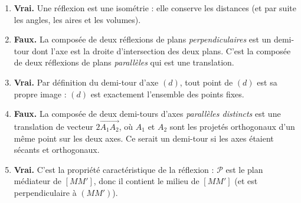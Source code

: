\documentclass[11pt]{article}
\newcommand{\cle}[1]{{\popxbold\color{popdark}#1}}
\begin{document}
\begin{corrige}
\begin{enumerate}
\item \textbf{Vrai.} Une réflexion est une isométrie : elle conserve les distances (et par suite les angles, les aires et les volumes).
\item \textbf{Faux.} La composée de deux réflexions de plans \emph{perpendiculaires} est un \cle{demi-tour} dont l'axe est la droite d'intersection des deux plans. C'est la composée de deux réflexions de plans \emph{parallèles} qui est une translation.
\item \textbf{Vrai.} Par définition du demi-tour d'axe $(d)$, tout point de $(d)$ est sa propre image : $(d)$ est exactement l'ensemble des points fixes.
\item \textbf{Faux.} La composée de deux demi-tours d'axes \emph{parallèles distincts} est une \cle{translation} de vecteur $2\overrightarrow{A_1A_2}$, où $A_1$ et $A_2$ sont les projetés orthogonaux d'un même point sur les deux axes. Ce serait un demi-tour si les axes étaient sécants et orthogonaux.
\item \textbf{Vrai.} C'est la propriété caractéristique de la réflexion : $\mathcal{P}$ est le plan médiateur de $[MM']$, donc il contient le milieu de $[MM']$ (et est perpendiculaire à $(MM')$).
\end{enumerate}
\end{corrige}
\end{document}
